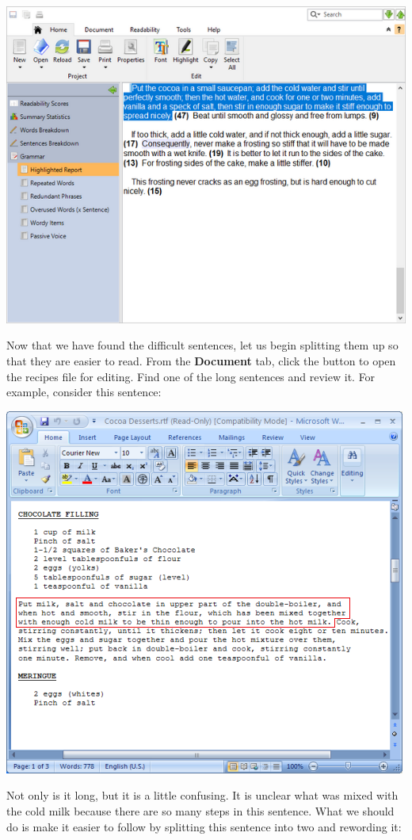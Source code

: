 \documentclass[
]{book}
\theoremstyle{definition}
\theoremstyle{definition}
\theoremstyle{definition}
\theoremstyle{definition}
\theoremstyle{remark}
\begin{document}
\includegraphics{Images/longsentenceselected.png}

Now that we have found the difficult sentences, let us begin splitting them up so that they are easier to read. From the \textbf{Document} tab, click the  button to open the recipes file for editing. Find one of the long sentences and review it. For example, consider this sentence:

\begin{center}\includegraphics[width=0.75\linewidth,]{Images/NonGenerated/sentencetoimprove} \end{center}

Not only is it long, but it is a little confusing. It is unclear what was mixed with the cold milk because there are so many steps in this sentence. What we should do is make it easier to follow by splitting this sentence into two and rewording it:
\end{document}
